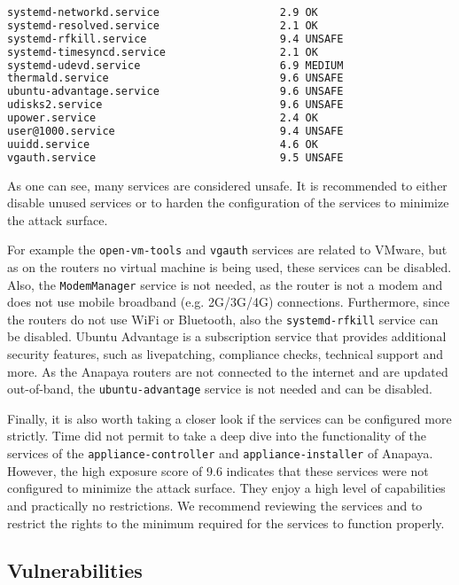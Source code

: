 \begin{lstlisting}[language=bash, deletekeywords={local}, numbers=none, caption={Output of \texttt{systemd-analyze security}}]
systemd-networkd.service                   2.9 OK        
systemd-resolved.service                   2.1 OK        
systemd-rfkill.service                     9.4 UNSAFE    
systemd-timesyncd.service                  2.1 OK        
systemd-udevd.service                      6.9 MEDIUM    
thermald.service                           9.6 UNSAFE    
ubuntu-advantage.service                   9.6 UNSAFE    
udisks2.service                            9.6 UNSAFE    
upower.service                             2.4 OK        
user@1000.service                          9.4 UNSAFE    
uuidd.service                              4.6 OK        
vgauth.service                             9.5 UNSAFE    
\end{lstlisting}

As one can see, many services are considered unsafe.
It is recommended to either disable unused services or to harden the configuration of the services to minimize the attack surface.

For example the \texttt{open-vm-tools} and \texttt{vgauth} services are related to VMware, but as on the routers no virtual machine is being used, these services can be disabled.
Also, the \texttt{ModemManager} service is not needed, as the router is not a modem and does not use mobile broadband (e.g. 2G/3G/4G) connections.
Furthermore, since the routers do not use WiFi or Bluetooth, also the \texttt{systemd-rfkill} service can be disabled.
Ubuntu Advantage is a subscription service that provides additional security features, such as livepatching, compliance checks, technical support and more.
As the Anapaya routers are not connected to the internet and are updated out-of-band, the \texttt{ubuntu-advantage} service is not needed and can be disabled.

Finally, it is also worth taking a closer look if the services can be configured more strictly.
Time did not permit to take a deep dive into the functionality of the services of the \texttt{appliance-controller} and \texttt{appliance-installer} of Anapaya.
However, the high exposure score of 9.6 indicates that these services were not configured to minimize the attack surface.
They enjoy a high level of capabilities and practically no restrictions.
We recommend reviewing the services and to restrict the rights to the minimum required for the services to function properly.


\subsection{Vulnerabilities}


